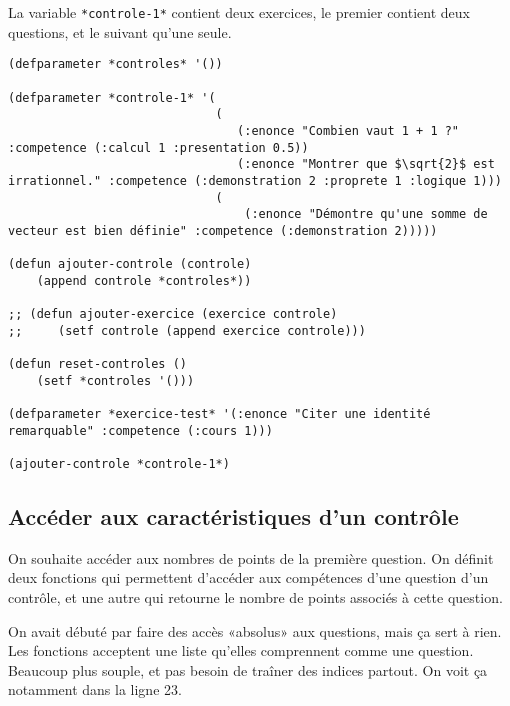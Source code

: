 \documentclass[a4paper, 11pt, DIV=18]{scrartcl}
\begin{document}
La variable \texttt{*controle-1*} contient deux exercices, le
premier contient deux questions, et le suivant qu'une seule.

\begin{verbatim}
(defparameter *controles* '())

(defparameter *controle-1* '(
                             (
                                (:enonce "Combien vaut 1 + 1 ?" :competence (:calcul 1 :presentation 0.5))
                                (:enonce "Montrer que $\sqrt{2}$ est irrationnel." :competence (:demonstration 2 :proprete 1 :logique 1)))
                             (
                                 (:enonce "Démontre qu'une somme de vecteur est bien définie" :competence (:demonstration 2)))))

(defun ajouter-controle (controle)
    (append controle *controles*))

;; (defun ajouter-exercice (exercice controle)
;;     (setf controle (append exercice controle)))

(defun reset-controles ()
    (setf *controles '()))

(defparameter *exercice-test* '(:enonce "Citer une identité remarquable" :competence (:cours 1)))

(ajouter-controle *controle-1*)
\end{verbatim}

\subsection{Accéder aux caractéristiques d'un contrôle}
\label{sec:orgfef553f}

On souhaite accéder aux nombres de points de la première question. On définit
deux fonctions qui permettent d'accéder aux compétences d'une question d'un
contrôle, et une autre qui retourne le nombre de points associés à cette question.

On avait débuté par faire des accès «absolus» aux questions, mais ça sert à
rien. Les fonctions acceptent une liste qu'elles comprennent comme une question.
Beaucoup plus souple, et pas besoin de traîner des indices partout. On voit ça
notamment dans la ligne 23.
\end{document}
